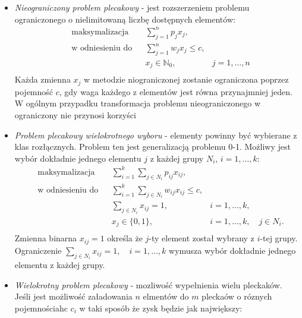 \begin{itemize}
\begin{equation}
  \end{equation}
  \item \textit{Nieograniczony problem plecakowy} - jest rozszerzeniem problemu ograniczonego o nielimitowaną liczbę dostępnych elementów:
  \begin{equation}\label{unboundedKnapsack}
    \begin{aligned}
      & \textrm{maksymalizacja} & & \sum_{j=1}^n p_jx_j, \\
      & \textrm{w odniesieniu do} & & \sum_{j=1}^n w_jx_j \le c, \\
      &&& x_j \in \mathbb{N}_0,& j = 1,\dots,n \\
    \end{aligned}
  \end{equation}
  Każda zmienna $x_j$ w metodzie niograniczonej zostanie ograniczona poprzez pojemność $c$, gdy waga każdego z elementów jest równa przynajmniej jeden. W ogólnym przypadku transformacja problemu nieograniczonego w ograniczony nie przynosi korzyści
  \item \textit{Problem plecakowy wielokrotnego wyboru} - elementy powinny być wybierane z klas rozłącznych. Problem ten jest generalizacją problemu 0-1. Możliwy jest wybór dokładnie jednego elementu $j$ z każdej grupy $N_i$, $i=1,\dots,k$:
  \begin{equation}\label{multichoiceKnapsack}
    \begin{aligned}
      & \textrm{maksymalizacja} & & \sum_{i=1}^k \sum_{j \in N_i} p_{ij}x_{ij}, \\
      & \textrm{w odniesieniu do} & & \sum_{i=1}^k \sum_{j \in N_i} w_{ij}x_{ij} \le c, \\
      &&& \sum_{j \in N_i} x_{ij} = 1, & i =1,\dots,k, \\
      &&& x_j \in\{0,1\},& i = 1,\dots,k, \quad j \in N_i. \\
    \end{aligned}
  \end{equation}
  Zmienna binarna $x_{ij} = 1$ określa że $j$-ty element został wybrany z $i$-tej grupy. Ograniczenie $\sum_{j \in N_i} x_{ij} = 1, \quad i =1,\dots,k$ wymusza wybór dokładnie jednego elementu z każdej grupy.
  \item \textit{Wielokrotny problem plecakowy} - mozliwość wypełnienia wielu pleckaków. Jeśli jest możliwość załadowania $n$ elmentów do $m$ pleckaów o róznych pojemnościahc $c_i$ w taki sposób że zysk będzie jak największy:
  \begin{equation}\label{multiKnapsack}
    \begin{aligned}

\end{aligned}
\end{equation}
\end{itemize}
